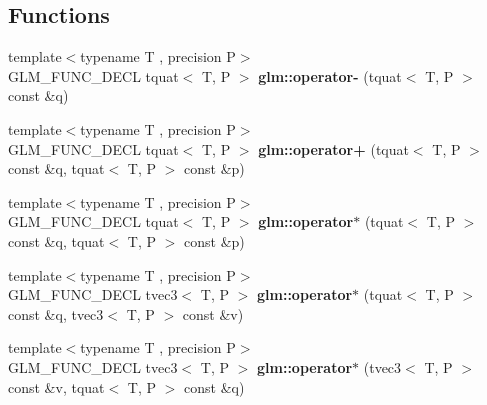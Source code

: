 \subsection*{Functions}
\begin{DoxyCompactItemize}
\item 
\hypertarget{group__gtc__quaternion_ga64cdb5fcebb192579798cfe79670239f}{{\footnotesize template$<$typename T , precision P$>$ }\\G\-L\-M\-\_\-\-F\-U\-N\-C\-\_\-\-D\-E\-C\-L tquat$<$ T, P $>$ {\bfseries glm\-::operator-\/} (tquat$<$ T, P $>$ const \&q)}\label{group__gtc__quaternion_ga64cdb5fcebb192579798cfe79670239f}

\item 
\hypertarget{group__gtc__quaternion_ga517657374d8ca180d63c33ff9430518a}{{\footnotesize template$<$typename T , precision P$>$ }\\G\-L\-M\-\_\-\-F\-U\-N\-C\-\_\-\-D\-E\-C\-L tquat$<$ T, P $>$ {\bfseries glm\-::operator+} (tquat$<$ T, P $>$ const \&q, tquat$<$ T, P $>$ const \&p)}\label{group__gtc__quaternion_ga517657374d8ca180d63c33ff9430518a}

\item 
\hypertarget{group__gtc__quaternion_gabca7455f687e322b505531e15786d845}{{\footnotesize template$<$typename T , precision P$>$ }\\G\-L\-M\-\_\-\-F\-U\-N\-C\-\_\-\-D\-E\-C\-L tquat$<$ T, P $>$ {\bfseries glm\-::operator$\ast$} (tquat$<$ T, P $>$ const \&q, tquat$<$ T, P $>$ const \&p)}\label{group__gtc__quaternion_gabca7455f687e322b505531e15786d845}

\item 
\hypertarget{group__gtc__quaternion_ga5b0cccc7f163f2b7bbf3536deb403d9a}{{\footnotesize template$<$typename T , precision P$>$ }\\G\-L\-M\-\_\-\-F\-U\-N\-C\-\_\-\-D\-E\-C\-L tvec3$<$ T, P $>$ {\bfseries glm\-::operator$\ast$} (tquat$<$ T, P $>$ const \&q, tvec3$<$ T, P $>$ const \&v)}\label{group__gtc__quaternion_ga5b0cccc7f163f2b7bbf3536deb403d9a}

\item 
\hypertarget{group__gtc__quaternion_ga70dbac44fc9fb59659218ad4ed7870ed}{{\footnotesize template$<$typename T , precision P$>$ }\\G\-L\-M\-\_\-\-F\-U\-N\-C\-\_\-\-D\-E\-C\-L tvec3$<$ T, P $>$ {\bfseries glm\-::operator$\ast$} (tvec3$<$ T, P $>$ const \&v, tquat$<$ T, P $>$ const \&q)}\label{group__gtc__quaternion_ga70dbac44fc9fb59659218ad4ed7870ed}


\end{DoxyCompactItemize}
